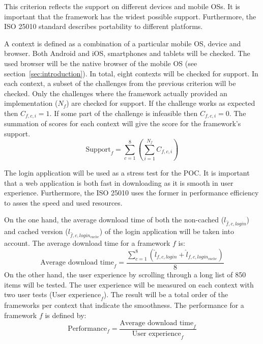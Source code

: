 \documentclass[a4paper]{artikel3}
\newcommand{\setspace}[0]{\vspace{2mm}}
\renewcommand{\paragraph}[1]{\setspace \noindent {\bf #1}  }
\begin{document}
\paragraph{Support}
This criterion reflects the support on different devices and mobile OSs.
It is important that the framework has the widest possible support.
Furthermore, the ISO 25010 standard describes portability to different platforms.

A context is defined as a combination of a particular mobile OS, device and browser.
Both Android and iOS, smartphones and tablets will be checked.
The used browser will be the native browser of the mobile OS (see section~\ref{sec:introduction}).
In total, eight contexts will be checked for support.
In each context,  a subset of the challenges from the previous criterion will be checked.  
Only the challenges where the framework actually provided an implementation ($N_f$) are checked for support.
If the challenge works as expected then $C_{f,c,i} = 1$.
If some part of the challenge is infeasible then $C_{f,c,i} = 0$.
The summation of scores for each context will give the score for the framework's support.
\begin{equation}
  \text{Support}_f = \sum_{c=1}^{8}{\left(\sum\limits_{i=1}^{N_f}C_{f,c,i}\right)}
  \label{eq:ondersteuning}
\end{equation}

\paragraph{Performance}
The login application will be used as a stress test for the POC.
It is important that a web application is both fast in downloading as it is smooth in user experience.
Furthermore, the ISO 25010 uses the former in performance efficiency to asses the speed and used resources.

On the one hand, the average download time of both the non-cached ($l_{\widehat{f},c,login}$) and cached version ($l_{\widehat{f},c,login_{cache}}$) of the login application will be taken into account.
The average download time for a framework $f$ is:
\begin{equation*}
   \text{Average download time}_f= \frac{\sum\limits_{c=1}^{8}{\left(\widehat{l}_{f,c,login}+\widehat{l}_{f,c,login_{cache}}\right)}}{8}
\end{equation*}
On the other hand, the user experience by scrolling through a long list of 850 items will be tested.
The user experience will be measured on each context with two user tests ($\text{User experience}_{f}$).
The result will be a total order of the frameworks per context that indicate the smoothness.
The performance for a framework $f$ is defined by:
\begin{equation}
\text{Performance}_f = \frac{\text{Average download time}_f}{\text{User experience}_f}
  \label{eq:performantie-enhanced}
\end{equation}
\end{document}
